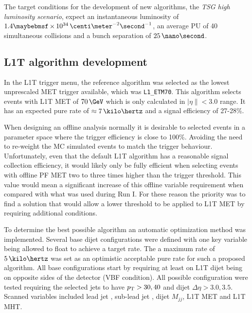 The target conditions for the development of new algorithms, the \textit{\gls{TSG} high luminosity scenario}, expect an instantaneous luminosity of  $1.4 \times 10^{34}\,\centi\meter^{-2}\second^{-1}$, an average \gls{PU} of 40 simultaneous collisions and a bunch separation of $25\,\nano\second$. 

\subsection{L1T algorithm development}
\label{SECTION:RunIITriggerStudies_L1TAlgorithmDevelopment}


In the \gls{L1T} trigger menu, the reference algorithm was selected as the lowest unprescaled \gls{MET} trigger available, which was \verb|L1_ETM70|. This algorithm selects events with \gls{L1T} \gls{MET} of $70\,\GeV$ which is only calculated in $|\eta\|<3.0$ range. It has an expected pure rate of $\approx 7\,\kilo\hertz$ and a signal efficiency of 27-28\%. 

When designing an offline analysis normally it is desirable to selected events in a parameter space where the trigger efficiency is close to 100\%. Avoiding the need to re-weight the \gls{MC} simulated events to match the trigger behaviour. Unfortunately, even that the default \gls{L1T} algorithm has a reasonable signal collection efficiency, it would likely only be fully efficient when selecting events with offline \gls{PF} \gls{MET} two to three times higher than the trigger threshold. This value would mean a significant increase of this offline variable requirement when compared with what was used during Run I. For these reason the priority was to find a solution that would allow a lower threshold to be applied to \gls{L1T} \gls{MET} by requiring additional conditions.

To determine the best possible algorithm an automatic optimization method was implemented. Several base dijet configurations were defined with one key variable being allowed to float to achieve a target rate. The a maximum rate of $5\,\kilo\hertz$ was set as an optimistic acceptable pure rate for such a proposed algorithm. All base configurations start by requiring at least on \gls{L1T} dijet being on opposite sides of the detector (\gls{VBF} condition). All possible configuration were tested requiring the selected jets to have  $p_{\mathrm{T}}>{30,40}$ and dijet $\Delta\eta>{3.0,3.5}$. Scanned variables included lead jet \pt, sub-lead jet \pt, dijet $M_{jj}$, \gls{L1T} \gls{MET} and \gls{L1T} \gls{MHT}. 

